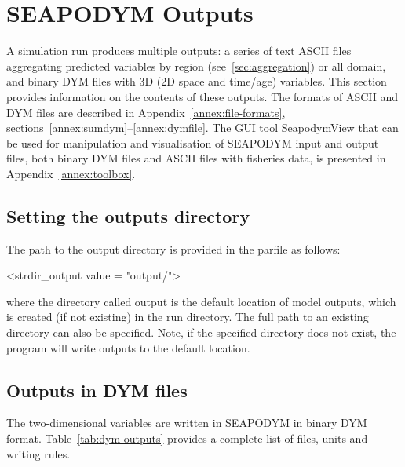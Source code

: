 \section{SEAPODYM Outputs}
\label{sec:seapodym-outputs}
A simulation run produces multiple outputs: a series of text ASCII files aggregating predicted variables by region (see~\ref{sec:aggregation}) or all domain, and binary DYM files with 3D (2D space and time/age) variables. This section provides information on the contents of these outputs. The formats of ASCII and DYM files are described in Appendix~\ref{annex:file-formats}, sections~\ref{annex:sumdym}--\ref{annex:dymfile}. The GUI tool SeapodymView that can be used for manipulation and visualisation of SEAPODYM input and output files, both binary DYM files and ASCII files with fisheries data, is presented in Appendix~\ref{annex:toolbox}.  

\subsection{Setting the outputs directory}

The path to the output directory is provided in the parfile as follows:

\begin{center}
{\ttfamily 
<strdir\_output value = "output/">}
\end{center}

\noindent where the directory called {\ttfamily output} is the default location of model outputs, which is created (if not existing) in the run directory. The full path to an existing directory can also be specified. Note, if the specified directory does not exist, the program will write outputs to the default location.  

 
\subsection{Outputs in DYM files} \label{sec:dym-outputs}

The two-dimensional variables are written in SEAPODYM in binary DYM format. Table~\ref{tab:dym-outputs} provides a complete list of files, units and writing rules.


